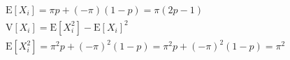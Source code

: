 \documentclass[preview]{standalone}
\begin{document}
\begin{align*}
\mathrm{E}\left[X_{i}\right]=\pi p + (-\pi)(1 - p) =\pi(2p - 1) \\\mathrm{V}\left[X_{i}\right]=\mathrm{E}\left[X_{i}^{2}\right]-\mathrm{E}\left[X_{i}\right]^{2} \\\mathrm{E}\left[X_{i} ^ {2}\right]=\pi^{2} p + (-\pi) ^ {2}(1 - p) =\pi ^ {2} p+(-\pi)^{2}(1-p)=\pi^{2}
\end{align*}
\end{document}
